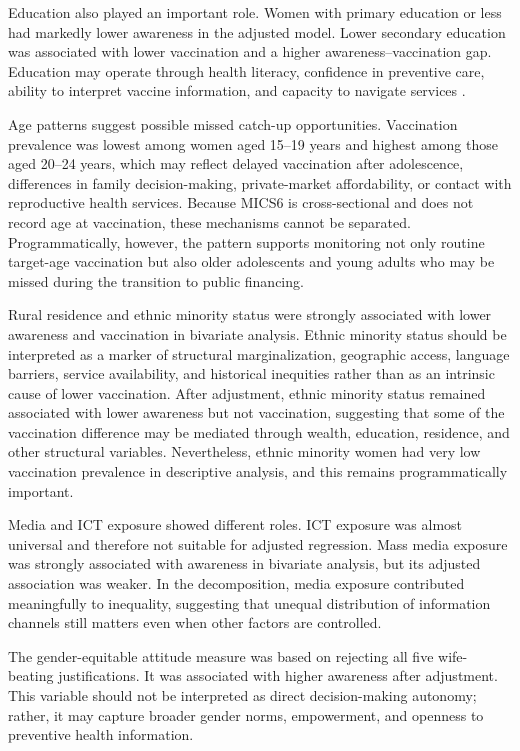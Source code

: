 Education also played an important role. Women with primary education or less had markedly lower awareness in the adjusted model. Lower secondary education was associated with lower vaccination and a higher awareness--vaccination gap. Education may operate through health literacy, confidence in preventive care, ability to interpret vaccine information, and capacity to navigate services \cite{nutbeam2008}.

Age patterns suggest possible missed catch-up opportunities. Vaccination prevalence was lowest among women aged 15--19 years and highest among those aged 20--24 years, which may reflect delayed vaccination after adolescence, differences in family decision-making, private-market affordability, or contact with reproductive health services. Because MICS6 is cross-sectional and does not record age at vaccination, these mechanisms cannot be separated. Programmatically, however, the pattern supports monitoring not only routine target-age vaccination but also older adolescents and young adults who may be missed during the transition to public financing.

Rural residence and ethnic minority status were strongly associated with lower awareness and vaccination in bivariate analysis. Ethnic minority status should be interpreted as a marker of structural marginalization, geographic access, language barriers, service availability, and historical inequities rather than as an intrinsic cause of lower vaccination. After adjustment, ethnic minority status remained associated with lower awareness but not vaccination, suggesting that some of the vaccination difference may be mediated through wealth, education, residence, and other structural variables. Nevertheless, ethnic minority women had very low vaccination prevalence in descriptive analysis, and this remains programmatically important.

Media and ICT exposure showed different roles. ICT exposure was almost universal and therefore not suitable for adjusted regression. Mass media exposure was strongly associated with awareness in bivariate analysis, but its adjusted association was weaker. In the decomposition, media exposure contributed meaningfully to inequality, suggesting that unequal distribution of information channels still matters even when other factors are controlled.

The gender-equitable attitude measure was based on rejecting all five wife-beating justifications. It was associated with higher awareness after adjustment. This variable should not be interpreted as direct decision-making autonomy; rather, it may capture broader gender norms, empowerment, and openness to preventive health information.

